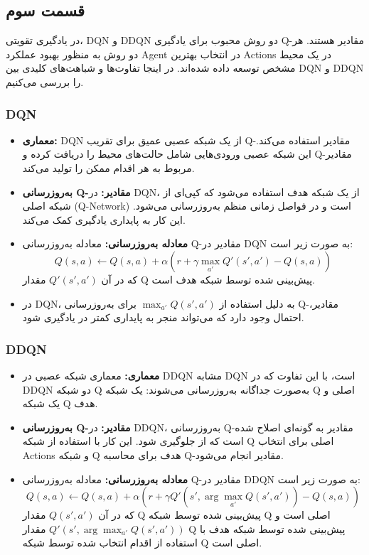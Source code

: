 \documentclass{article}
\begin{document}
\subsection{قسمت سوم}


در یادگیری تقویتی، DQN و DDQN دو روش محبوب برای یادگیری Q-مقادیر هستند. هر دو روش به منظور بهبود عملکرد Agent در انتخاب بهترین Actions در یک محیط مشخص توسعه داده شده‌اند. در اینجا تفاوت‌ها و شباهت‌های کلیدی بین DQN و DDQN را بررسی می‌کنیم.

\subsubsection{DQN}

\begin{itemize}
  \item \textbf{معماری:} DQN از یک شبکه عصبی عمیق برای تقریب Q-مقادیر استفاده می‌کند. این شبکه عصبی ورودی‌هایی شامل حالت‌های محیط را دریافت کرده و Q-مقادیر مربوط به هر اقدام ممکن را تولید می‌کند.
  \item \textbf{به‌روزرسانی Q-مقادیر:} در DQN، از یک شبکه هدف  استفاده می‌شود که کپی‌ای از شبکه اصلی (Q-Network) است و در فواصل زمانی منظم به‌روزرسانی می‌شود. این کار به پایداری یادگیری کمک می‌کند.
  \item \textbf{معادله به‌روزرسانی:} معادله به‌روزرسانی Q-مقادیر در DQN به صورت زیر است:
  \[
  Q(s, a) \leftarrow Q(s, a) + \alpha \left( r + \gamma \max_{a'} Q'(s', a') - Q(s, a) \right)
  \]
  که در آن \( Q'(s', a') \) مقدار Q پیش‌بینی شده توسط شبکه هدف است.
  \item \textbf{} در DQN، به دلیل استفاده از \(\max_{a'} Q(s', a')\) برای به‌روزرسانی Q-مقادیر، احتمال وجود دارد که می‌تواند منجر به پایداری کمتر در یادگیری شود.
\end{itemize}

\subsubsection{DDQN}

\begin{itemize}
  \item \textbf{معماری:} معماری شبکه عصبی در DDQN مشابه DQN است، با این تفاوت که در DDQN دو شبکه Q به‌صورت جداگانه به‌روزرسانی می‌شوند: یک شبکه Q اصلی و یک شبکه Q هدف.
  \item \textbf{به‌روزرسانی Q-مقادیر:} در DDQN، به‌روزرسانی Q-مقادیر به گونه‌ای اصلاح شده است که از جلوگیری شود. این کار با استفاده از شبکه Q اصلی برای انتخاب Actions و شبکه Q هدف برای محاسبه Q-مقادیر انجام می‌شود.
  \item \textbf{معادله به‌روزرسانی:} معادله به‌روزرسانی Q-مقادیر در DDQN به صورت زیر است:
  \[
  Q(s, a) \leftarrow Q(s, a) + \alpha \left( r + \gamma Q'(s', \arg\max_{a'} Q(s', a')) - Q(s, a) \right)
  \]
  که در آن \( Q(s', a') \) مقدار Q پیش‌بینی شده توسط شبکه Q اصلی است و \( Q'(s', \arg\max_{a'} Q(s', a')) \) مقدار Q پیش‌بینی شده توسط شبکه هدف با استفاده از اقدام انتخاب شده توسط شبکه Q اصلی است.

\end{itemize}
\end{document}
